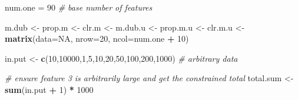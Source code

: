 \documentclass[onecolumn]{book}
\newenvironment{Shaded}{\begin{snugshade}}{\end{snugshade}}
\newcommand{\CommentTok}[1]{\textcolor[rgb]{0.56,0.35,0.01}{\textit{#1}}}
\newcommand{\DataTypeTok}[1]{\textcolor[rgb]{0.13,0.29,0.53}{#1}}
\newcommand{\DecValTok}[1]{\textcolor[rgb]{0.00,0.00,0.81}{#1}}
\newcommand{\KeywordTok}[1]{\textcolor[rgb]{0.13,0.29,0.53}{\textbf{#1}}}
\newcommand{\NormalTok}[1]{#1}
\newcommand{\OperatorTok}[1]{\textcolor[rgb]{0.81,0.36,0.00}{\textbf{#1}}}
\newcommand{\OtherTok}[1]{\textcolor[rgb]{0.56,0.35,0.01}{#1}}
\newcommand{\StringTok}[1]{\textcolor[rgb]{0.31,0.60,0.02}{#1}}
\theoremstyle{definition}
\theoremstyle{definition}
\theoremstyle{definition}
\theoremstyle{remark}
\begin{document}
\begin{Shaded}
\begin{Highlighting}[]
\NormalTok{num.one =}\StringTok{ }\DecValTok{90} \CommentTok{# base number of features}

\NormalTok{m.dub <-}\StringTok{ }\NormalTok{prop.m <-}\StringTok{ }\NormalTok{clr.m <-}\StringTok{ }\NormalTok{m.dub.u <-}\StringTok{ }\NormalTok{prop.m.u <-}\StringTok{ }\NormalTok{clr.m.u <-}
\StringTok{    }\KeywordTok{matrix}\NormalTok{(}\DataTypeTok{data=}\OtherTok{NA}\NormalTok{, }\DataTypeTok{nrow=}\DecValTok{20}\NormalTok{, }\DataTypeTok{ncol=}\NormalTok{num.one }\OperatorTok{+}\StringTok{ }\DecValTok{10}\NormalTok{)}

\NormalTok{in.put <-}\StringTok{ }\KeywordTok{c}\NormalTok{(}\DecValTok{10}\NormalTok{,}\DecValTok{10000}\NormalTok{,}\DecValTok{1}\NormalTok{,}\DecValTok{5}\NormalTok{,}\DecValTok{10}\NormalTok{,}\DecValTok{20}\NormalTok{,}\DecValTok{50}\NormalTok{,}\DecValTok{100}\NormalTok{,}\DecValTok{200}\NormalTok{,}\DecValTok{1000}\NormalTok{) }\CommentTok{# arbitrary data}

\CommentTok{# ensure feature 3 is arbitrarily large and get the constrained total}
\NormalTok{total.sum <-}\StringTok{ }\KeywordTok{sum}\NormalTok{(in.put }\OperatorTok{+}\StringTok{ }\DecValTok{1}\NormalTok{) }\OperatorTok{*}\StringTok{ }\DecValTok{1000}


\end{Highlighting}
\end{Shaded}
\end{document}
